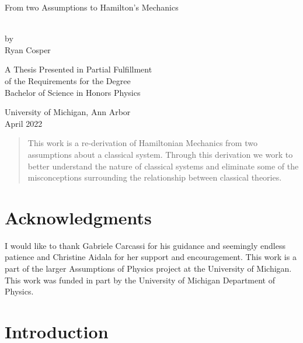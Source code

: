 \documentclass{article}[a4paper]
\newcommand{\doublespace} {
  \renewcommand{\baselinestretch}{1.66}\small\normalsize
}
\newcommand{\exactdoublespace} {
  \renewcommand{\baselinestretch}{1.8}\small\normalsize
}
\newcommand{\singlespace} {
  \renewcommand{\baselinestretch}{0.9}\small\normalsize
}
\newlength{\fiveblanklines}\setlength{\fiveblanklines}{0.7 in}
\newlength{\tenblanklines}\setlength{\tenblanklines}{1.5 in}
\begin{document}
\thispagestyle{empty}
\exactdoublespace
  \begin{center}
    \begin{LARGE} From two Assumptions to Hamilton's Mechanics\end{LARGE}\\
    by\\
    Ryan Cosper
  \end{center}
  \singlespace

  \vspace{\fiveblanklines}
  \begin{center}
    \singlespace
A Thesis Presented in Partial Fulfillment\\
of the Requirements for the Degree\\
Bachelor of Science in Honors Physics
  \end{center}
  \vspace{\tenblanklines}
   \vfill
   \begin{center}
   \doublespace
   University of Michigan, Ann Arbor\\
   April 2022
   \end{center}
\newpage

\begin{abstract}

	This work is a re-derivation of Hamiltonian Mechanics from two assumptions about a classical system. Through this derivation we work to better understand the nature of classical systems and eliminate some of the misconceptions surrounding the relationship between classical theories.

\end{abstract}

\section*{Acknowledgments}

	I would like to thank Gabriele Carcassi for his guidance and seemingly endless patience and Christine Aidala for her support and encouragement. This work is a part of the larger Assumptions of Physics project at the University of Michigan. This work was funded in part by the University of Michigan Department of Physics.

\newpage
\tableofcontents
\newpage



\section{Introduction}
\end{document}
